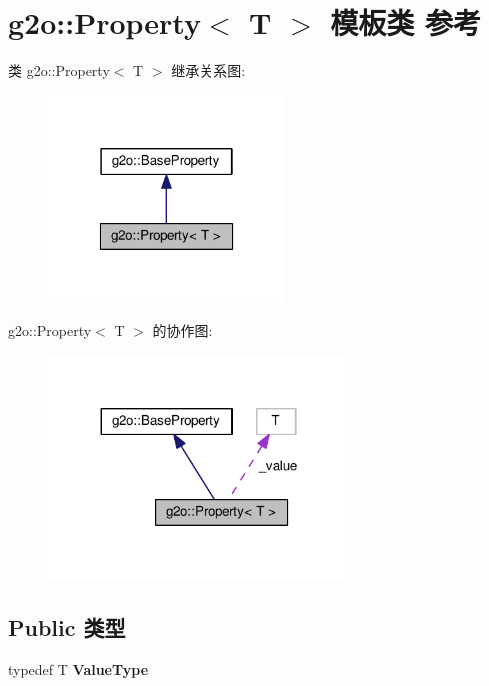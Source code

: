 \hypertarget{classg2o_1_1Property}{\section{g2o\-:\-:Property$<$ T $>$ 模板类 参考}
\label{classg2o_1_1Property}
}


类 g2o\-:\-:Property$<$ T $>$ 继承关系图\-:
\nopagebreak
\begin{figure}[H]
\begin{center}
\leavevmode
\includegraphics[width=178pt]{classg2o_1_1Property__inherit__graph}
\end{center}
\end{figure}


g2o\-:\-:Property$<$ T $>$ 的协作图\-:
\nopagebreak
\begin{figure}[H]
\begin{center}
\leavevmode
\includegraphics[width=227pt]{classg2o_1_1Property__coll__graph}
\end{center}
\end{figure}
\subsection*{Public 类型}
\begin{DoxyCompactItemize}
\item 
\hypertarget{classg2o_1_1Property_a0387bb74c147b54b8fa4f4cd5629fbf8}{typedef T {\bfseries Value\-Type}}\label{classg2o_1_1Property_a0387bb74c147b54b8fa4f4cd5629fbf8}

\end{DoxyCompactItemize}
